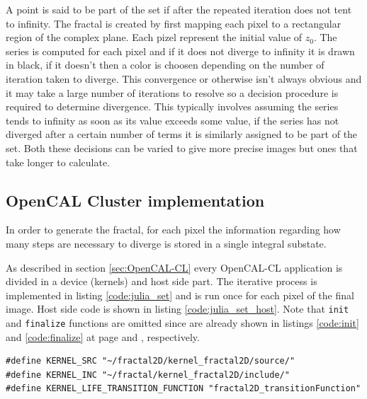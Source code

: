 {A point is said to be part of the set if after the repeated iteration does not tent to infinity.
The fractal  is created by first mapping each pixel to a rectangular region of the complex plane. Each pizel represent the initial value of $z_0$. The series is computed for each pixel and if it does not diverge to infinity it is drawn in black, if it doesn't then a color is choosen depending on the number of iteration taken to diverge. This convergence or otherwise isn't always obvious and it may take a large number of iterations to resolve so a decision procedure is required to determine divergence. This typically involves assuming the series tends to infinity as soon as its value exceeds some value, if the series has not diverged after a certain number of terms it is similarly assigned to be part of the set. Both these decisions can be varied to give more precise images but ones that take longer to calculate. 

\subsection{OpenCAL Cluster implementation}
In order to generate the fractal, for each pixel the information regarding how many steps are necessary to diverge is stored in a single integral substate.

As described in section \ref{sec:OpenCAL-CL} every OpenCAL-CL application is divided in a device (kernels) and host side part. 
The iterative process is implemented in listing \ref{code:julia_set} and is run once for each pixel of the final image.
Host side code is shown in listing \ref{code:julia_set_host}. Note that \texttt{init} and \texttt{finalize} functions are omitted since are already shown in listings \ref{code:init} and \ref{code:finalize} at page \pageref{code:init} and \pageref{code:finalize} , respectively.

\begin{lstlisting}
#define KERNEL_SRC "~/fractal2D/kernel_fractal2D/source/"
#define KERNEL_INC "~/fractal/kernel_fractal2D/include/"
#define KERNEL_LIFE_TRANSITION_FUNCTION "fractal2D_transitionFunction"


\end{lstlisting}}
